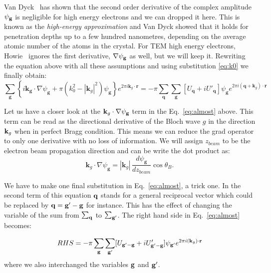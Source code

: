 Van Dyck~\cite{VanDyck76} has shown that the second order derivative of the complex amplitude $\psi_{\vb{g}}$ is negligible for high energy electrons and we can dropped it here. This is known as the \textit{high-energy approximation} and Van Dyck showed that it holds for penetration depths up to a few hundred nanometres, depending on the average atomic number of the atoms in the crystal. For TEM high energy electrons, Howie~\cite{Howie61} ignores the first derivative, $\nabla \psi_{\vb{g}}$ as well, but we will keep it. Rewriting the equation above with all these assumptions and using substitution \ref{eq:k0} we finally obtain:
\begin{equation}
\label{eq:almost}
\sum_\mathbf{g}\left\{ i \mathbf{k_g} \cdot \nabla \psi_\mathbf{g}  + \pi \left(k_0^2 - |\mathbf{k}_g|^2\right) \psi_\mathbf{g} \right\} e^{2\pi i\mathbf{k}_g \cdot \mathbf{r}} =
-\pi \sum_\mathbf{q}\sum_\mathbf{g} [U_\mathbf{q} + iU'_\mathbf{q}]\psi_\mathbf{g} e^{2\pi i(\mathbf{q}+\mathbf{k}_g)\cdot \mathbf{r}} 
\end{equation}


Let us have a closer look at the $\vb{k}_g \cdot  \nabla \psi_\mathbf{g} $ term in the Eq.~\ref{eq:almost} above. This term can be read as the directional derivative of the Bloch wave $g$ in the direction $\vb{k}_g$ when in perfect Bragg condition. This means we can reduce the grad operator to only one derivative with no loss of information.  We will assign $z_{beam}$ to be the electron beam propagation direction and can be write the dot product as:
\begin{equation*}
\mathbf{k}_g \cdot \nabla \psi_\mathbf{g} = \left| \mathbf{k}_g \right| \, \frac{d \psi_\mathbf{g}}{dz_{beam}} \cos{\theta_B}.
\end{equation*}



We have to make one final substitution in Eq.~\ref{eq:almost}, a trick one. In the second term of this equation $\vb{q}$ stands for a general reciprocal vector which could be replaced by $\vb{q} = \vb{g'}-\vb{g}$ for instance. This has the effect of changing the variable of the sum from $\sum_{\vb{q}}$ to $\sum_{\vb{g'}}$. The right hand side in Eq.~\ref{eq:almost} becomes:

\begin{equation*}
    RHS = -\pi \sum_\mathbf{g}\sum_\mathbf{g'} [U_{\mathbf{g'}-\vb{g}} + iU'_{\mathbf{g'}-\vb{g}}]\psi_\mathbf{g'} e^{2\pi i(\mathbf{k}_g)\cdot \mathbf{r}}
\end{equation*}
where we also interchanged the variables $\vb{g}$ and $\vb{g'}$.
 
